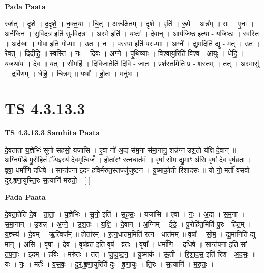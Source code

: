 \documentclass[17pt]{extarticle}
\begin{document}
\textbf{Pada Paata} \newline

रुश॑त् । दृ॒शे । द॒दृ॒शे॒ । न॒क्त॒या । चि॒त् । अरू᳚क्षितम् । दृ॒शे । एति॑ । रू॒पे । अन्न᳚म् ॥ सः । ए॒ना । अनी॑केन । सु॒वि॒दत्र॒ इति॑ सु-वि॒दत्रः॑ । अ॒स्मे इति॑ । यष्टा᳚ । दे॒वान् । आय॑जिष्ठ॒ इत्या - य॒जि॒ष्ठः॒ । स्व॒स्ति ॥ अद॑ब्धः । गो॒पा इति गो-पाः । उ॒त । नः॒ । प॒र॒स्पा इति॑ परः-पाः । अग्ने᳚ । द्यु॒मदिति॑ द्यु - मत् । उ॒त । रे॒वत् । दि॒दी॒हि॒ ॥ स्व॒स्ति । नः॒ । दि॒वः । अ॒ग्ने॒ । पृ॒थि॒व्याः । वि॒श्वायु॒रिति॑ वि॒श्व - आ॒युः॒ । धे॒हि॒ । य॒जथा॑य । दे॒व॒ ॥ यत् । सी॒महि॑ । दि॒वि॒जा॒तेति॑ दिवि - जा॒त॒ । प्रश॑स्त॒मिति॒ प्र - श॒स्त॒म् । तत् । अ॒स्मासु॑ । द्रवि॑णम् । धे॒हि॒ । चि॒त्रम् ॥ यथा᳚ । हो॒तः॒ । मनु॑षः ।  \newline





\section{ TS 4.3.13.3 }

\textbf{TS 4.3.13.3 } \newline
\textbf{Samhita Paata} \newline

दे॒वता॑ता य॒ज्ञेभिः॑ सूनो सहसो॒ यजा॑सि । ए॒वा नो॑ अ॒द्य स॑म॒ना स॑मा॒नानु॒-शन्न॑ग्न उश॒तो य॑क्षि दे॒वान् ॥ अ॒ग्निमी॑डे पु॒रोहि॑तं ॅय॒ज्ञ्स्य॑ दे॒वमृ॒त्विजं᳚ । होता॑रꣳ रत्न॒धात॑मं ॥ वृषा॑ सोम द्यु॒माꣳ अ॑सि॒ वृषा॑ देव॒ वृष॑व्रतः । वृषा॒ धर्मा॑णि दधिषे ॥ सान्त॑पना इ॒दꣳ ह॒विर्मरु॑त॒स्तज्जु॑जुष्टन । यु॒ष्माको॒ती रि॑शादसः ॥ यो नो॒ मर्तो॑ वसवो दुर्.हृणा॒युस्ति॒रः स॒त्यानि॑ मरुतो॒ - [  ] \newline

\textbf{Pada Paata} \newline

दे॒वता॒तेति॑ दे॒व - ता॒ता॒ । य॒ज्ञेभिः॑ । सू॒नो॒ इति॑ । स॒ह॒सः॒ । यजा॑सि ॥ ए॒वा । नः॒ । अ॒द्य । स॒म॒ना । स॒मा॒नान् । उ॒शन्न् । अ॒ग्ने॒ । उ॒श॒तः । य॒क्षि॒ । दे॒वान् ॥ अ॒ग्निम् । ई॒डे॒ । पु॒रोहि॑त॒मिति॑ पु॒रः - हि॒त॒म् । य॒ज्ञ्स्य॑ । दे॒वम् । ऋ॒त्विज᳚म् ॥ होता॑रम् । र॒त्न॒धात॑म॒मिति॑ रत्न - धात॑मम् ॥ वृषा᳚ । सो॒म॒ । द्यु॒मानिति॑ द्यु-मान् । अ॒सि॒ । वृषा᳚ । दे॒व॒ । वृष॑व्रत॒ इति॒ वृष॑ - व्र॒तः॒ ॥ वृषा᳚ । धर्मा॑णि । द॒धि॒षे॒ ॥ सान्त॑पना॒ इति॒ सां - त॒प॒नाः॒ । इ॒दम् । ह॒विः । मरु॑तः । तत् । जु॒जु॒ष्ट॒न॒ ॥ यु॒ष्माक॑ । ऊ॒ती । रि॒शा॒द॒स॒ इति॑ रिश - अ॒द॒सः॒ ॥ यः । नः॒ । मर्तः॑ । व॒स॒वः॒ । दु॒र्॒.हृ॒णा॒युरिति॑ दुः - हृ॒णा॒युः । ति॒रः । स॒त्यानि॑ । म॒रु॒तः॒ ।  \newline
\end{document}
